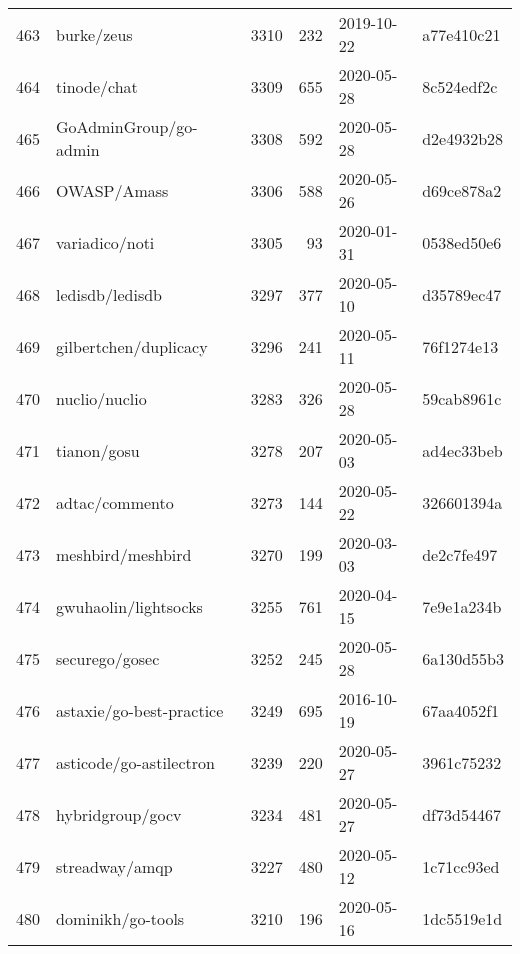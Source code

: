 \begin{longtable}{llrrll}
    463 &                                         burke/zeus &   3310 &    232 & 2019-10-22 &  a77e410c21 \\
    464 &                                        tinode/chat &   3309 &    655 & 2020-05-28 &  8c524edf2c \\
    465 &                              GoAdminGroup/go-admin &   3308 &    592 & 2020-05-28 &  d2e4932b28 \\
    466 &                                        OWASP/Amass &   3306 &    588 & 2020-05-26 &  d69ce878a2 \\
    467 &                                     variadico/noti &   3305 &     93 & 2020-01-31 &  0538ed50e6 \\
    468 &                                    ledisdb/ledisdb &   3297 &    377 & 2020-05-10 &  d35789ec47 \\
    469 &                              gilbertchen/duplicacy &   3296 &    241 & 2020-05-11 &  76f1274e13 \\
    470 &                                      nuclio/nuclio &   3283 &    326 & 2020-05-28 &  59cab8961c \\
    471 &                                        tianon/gosu &   3278 &    207 & 2020-05-03 &  ad4ec33beb \\
    472 &                                     adtac/commento &   3273 &    144 & 2020-05-22 &  326601394a \\
    473 &                                  meshbird/meshbird &   3270 &    199 & 2020-03-03 &  de2c7fe497 \\
    474 &                               gwuhaolin/lightsocks &   3255 &    761 & 2020-04-15 &  7e9e1a234b \\
    475 &                                     securego/gosec &   3252 &    245 & 2020-05-28 &  6a130d55b3 \\
    476 &                           astaxie/go-best-practice &   3249 &    695 & 2016-10-19 &  67aa4052f1 \\
    477 &                            asticode/go-astilectron &   3239 &    220 & 2020-05-27 &  3961c75232 \\
    478 &                                   hybridgroup/gocv &   3234 &    481 & 2020-05-27 &  df73d54467 \\
    479 &                                     streadway/amqp &   3227 &    480 & 2020-05-12 &  1c71cc93ed \\
    480 &                                  dominikh/go-tools &   3210 &    196 & 2020-05-16 &  1dc5519e1d \\

\end{longtable}
